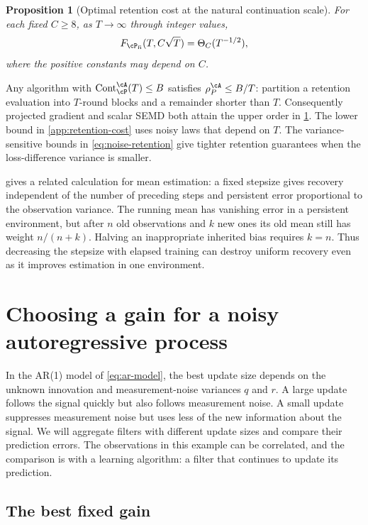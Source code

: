 \documentclass[11pt,twoside]{article}
\newtheorem{proposition}[theorem]{Proposition}
\theoremstyle{definition}
\theoremstyle{remark}
\DeclareMathOperator{\Cont}{Cont}
\begin{document}
\begin{proposition}[Optimal retention cost at the natural continuation scale]
\label{prop:natural-cost}
For each fixed $C\ge8$, as $T\to\infty$ through integer values,
\[
 F_{\cP_{\rm fi}}(T,C\sqrt T)=\Theta_C(T^{-1/2}),
\]
where the positive constants may depend on $C$.
\end{proposition}

Any algorithm with $\Cont_{\cP}^{\cA}(T)\le B$ satisfies
$\rho_P^\cA\le B/T$: partition a retention evaluation into $T$-round
blocks and a remainder shorter than $T$. Consequently projected gradient
and scalar SEMD both attain the upper order in
\cref{prop:natural-cost}. The lower bound in \cref{app:retention-cost}
uses noisy laws that depend on $T$. The variance-sensitive bounds in
\cref{eq:noise-retention} give tighter retention guarantees when the
loss-difference variance is smaller.

 gives a related calculation for mean estimation:
a fixed stepsize gives recovery independent of the number of preceding
steps and persistent error proportional to the observation variance.
The running mean has vanishing error in a persistent environment, but after
$n$ old observations and $k$ new ones its old mean still has weight
$n/(n+k)$. Halving an inappropriate inherited bias requires $k=n$.
Thus decreasing the stepsize with elapsed training can destroy uniform
recovery even as it improves estimation in one environment.

\section{Choosing a gain for a noisy autoregressive process}
\label{sec:stepsize-aggregation}

In the AR(1) model of \cref{eq:ar-model}, the best update size depends on
the unknown innovation and measurement-noise variances $q$ and $r$. A large update follows the signal
quickly but also follows measurement noise. A small update suppresses
measurement noise but uses less of the new information about the signal.
We will aggregate filters with different update sizes and compare their
prediction errors. The observations in this example can be correlated, and
the comparison is with a learning algorithm: a filter that continues to
update its prediction.

\subsection{The best fixed gain}
\end{document}
